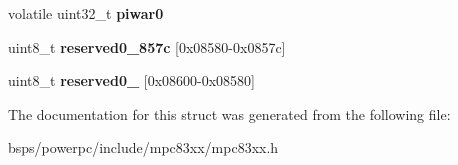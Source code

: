 \begin{DoxyCompactItemize}
\mbox{\label{structm83xxPCICtrlRegisters___acc1e5a41c7eae61c09567c28afa96e2f}} 
volatile uint32\+\_\+t {\bfseries piwar0}
\item 
\mbox{\label{structm83xxPCICtrlRegisters___a4fcb61604fe5e9c77a9b40c8c0d05b41}} 
uint8\+\_\+t {\bfseries reserved0\+\_\+857c} \mbox{[}0x08580-\/0x0857c\mbox{]}
\item 
\mbox{\label{structm83xxPCICtrlRegisters___adf71cd9d0a0667aef617a3505edb0cf2}} 
uint8\+\_\+t {\bfseries reserved0\+\_} \mbox{[}0x08600-\/0x08580\mbox{]}
\end{DoxyCompactItemize}


The documentation for this struct was generated from the following file\+:\begin{DoxyCompactItemize}
\item 
bsps/powerpc/include/mpc83xx/mpc83xx.\+h\end{DoxyCompactItemize}
